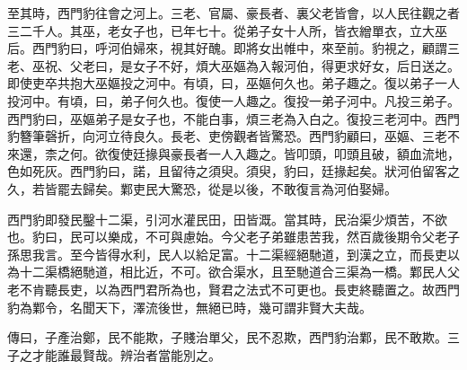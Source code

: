 至其時，西門豹往會之河上。三老、官屬、豪長者、裏父老皆會，以人民往觀之者三二千人。其巫，老女子也，已年七十。從弟子女十人所，皆衣繒單衣，立大巫后。西門豹曰，呼河伯婦來，視其好醜。即將女出帷中，來至前。豹視之，顧謂三老、巫祝、父老曰，是女子不好，煩大巫嫗為入報河伯，得更求好女，后日送之。即使吏卒共抱大巫嫗投之河中。有頃，曰，巫嫗何久也。弟子趣之。復以弟子一人投河中。有頃，曰，弟子何久也。復使一人趣之。復投一弟子河中。凡投三弟子。西門豹曰，巫嫗弟子是女子也，不能白事，煩三老為入白之。復投三老河中。西門豹簪筆磬折，向河立待良久。長老、吏傍觀者皆驚恐。西門豹顧曰，巫嫗、三老不來還，柰之何。欲復使廷掾與豪長者一人入趣之。皆叩頭，叩頭且破，額血流地，色如死灰。西門豹曰，諾，且留待之須臾。須臾，豹曰，廷掾起矣。狀河伯留客之久，若皆罷去歸矣。鄴吏民大驚恐，從是以後，不敢復言為河伯娶婦。

西門豹即發民鑿十二渠，引河水灌民田，田皆溉。當其時，民治渠少煩苦，不欲也。豹曰，民可以樂成，不可與慮始。今父老子弟雖患苦我，然百歲後期令父老子孫思我言。至今皆得水利，民人以給足富。十二渠經絕馳道，到漢之立，而長吏以為十二渠橋絕馳道，相比近，不可。欲合渠水，且至馳道合三渠為一橋。鄴民人父老不肯聽長吏，以為西門君所為也，賢君之法式不可更也。長吏終聽置之。故西門豹為鄴令，名聞天下，澤流後世，無絕已時，幾可謂非賢大夫哉。

傳曰，子產治鄭，民不能欺，子賤治單父，民不忍欺，西門豹治鄴，民不敢欺。三子之才能誰最賢哉。辨治者當能別之。